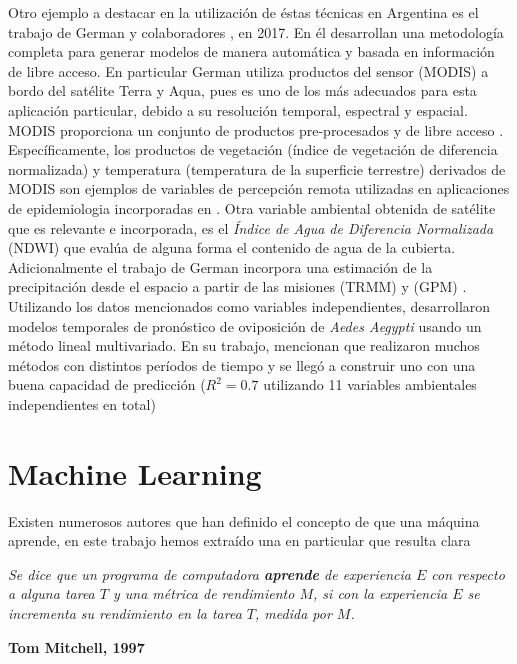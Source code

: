 \par Otro ejemplo a destacar en la utilización de éstas técnicas en Argentina es
  el trabajo de German y colaboradores \cite{german_temporal}, en 2017.
  En él desarrollan una metodología completa
  para generar modelos de manera automática y basada en información de libre
  acceso. En particular German \cite{german_temporal} utiliza productos del sensor (MODIS) a bordo
  del satélite Terra y Aqua, pues es uno de los más adecuados para esta
  aplicación particular, debido a su resolución temporal, espectral y espacial.
  MODIS proporciona un conjunto de productos pre-procesados y de libre acceso \cite{terra_aqua_modis}.
  Específicamente, los productos de vegetación (índice de vegetación de diferencia
  normalizada) y temperatura (temperatura de la superficie terrestre) derivados
  de MODIS son ejemplos de variables de percepción remota utilizadas
  en aplicaciones de epidemiologia \cite{porcasi_operative, butt_use_modis}
  incorporadas en \cite{german_temporal}. Otra variable
  ambiental obtenida de satélite que es relevante e incorporada, es el
  \textit{Índice de Agua de Diferencia Normalizada} (NDWI) que evalúa de alguna
  forma el contenido de agua de la cubierta. Adicionalmente el trabajo de German
  incorpora una estimación de la precipitación desde el espacio a partir de las
  misiones (TRMM) y (GPM) \cite{trmm_mision}.
  Utilizando los datos mencionados como variables independientes,
  desarrollaron modelos temporales de pronóstico de oviposición de \textit{Aedes Aegypti}
  usando un método lineal multivariado. En su trabajo, mencionan que
  realizaron muchos métodos con distintos períodos de tiempo y se llegó a
  construir uno con una buena capacidad de
  predicción ($R^{2} = 0.7 $ utilizando 11 variables ambientales independientes en total)


  \section{Machine Learning}

    \par Existen numerosos autores que han definido el concepto de que una máquina
      aprende, en este trabajo hemos extraído una en particular que resulta
      clara
      \begin{framed}
        \begin{center}
          \textit{Se dice que un programa de computadora \textbf{aprende} de experiencia
          $E$ con respecto a alguna tarea $T$ y una métrica de rendimiento $M$, si
          con la experiencia $E$ se incrementa su rendimiento en la tarea $T$,
          medida por $M$.}\\
        \end{center}
        \centering \textbf{Tom Mitchell, 1997} \cite{mitchell_learn}
      \end{framed}

